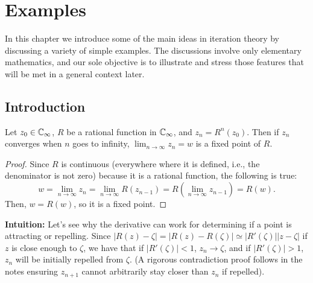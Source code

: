\chapter{Examples}
\label{chp:examples}

In this chapter we introduce some of the main ideas in iteration theory by
discussing a variety of simple examples. The discussions involve only elementary
mathematics, and our sole objective is to illustrate and stress those features
that will be met in a general context later.

\section{Introduction}
\label{sec:introduction}

\begin{proposition} Let $z_0 \in \mathbb{C}_\infty$, $R$ be a rational function in $\mathbb{C}_\infty$, and $z_n
    = R^n(z_0)$. Then if $z_n$ converges when $n$ goes to infinity, $\lim_{n \to
    \infty} z_n = w$ is a fixed point of $R$.
\end{proposition}

\begin{proof}
    Since $R$ is continuous (everywhere where it is defined, i.e., the
    denominator is not zero) because it is a rational function, the following is
    true:
    \begin{equation*}
        w = \lim_{n \to \infty} z_n = \lim_{n \to \infty} R(z_{n-1}) = R\left(\lim_{n \to \infty} z_{n-1}\right) = R(w).
    \end{equation*}
    Then, $w = R(w)$, so it is a fixed point.
\end{proof}

\textbf{Intuition:} Let's see why the derivative can work for determining if a
point is attracting or repelling. Since $|R(z) - \zeta| = |R(z) - R(\zeta)|
\simeq |R'(\zeta)| |z - \zeta|$ if $z$ is close enough to $\zeta$, we have that
if $|R'(\zeta)| < 1$, $z_n \to \zeta$, and if $|R'(\zeta)| > 1$, $z_n$ will be
initially repelled from $\zeta$. (A rigorous contradiction proof follows in the
notes ensuring $z_{n+1}$ cannot arbitrarily stay closer than $z_n$ if repelled).

